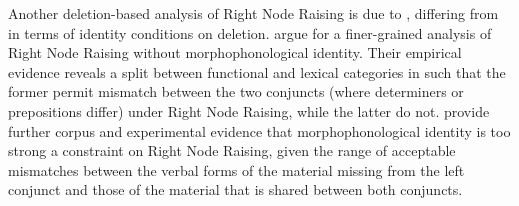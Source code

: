 


%

Another deletion-based analysis of Right Node Raising is due to \citet{Abeille2016, Shiraishi2019},
differing from \citet{Chaves2014} in terms of identity conditions on deletion. \citet{Abeille2016}
argue for a finer-grained analysis of  Right Node Raising without morphophonological
identity. Their empirical evidence reveals a split between functional and lexical categories in
 such that the former permit mismatch between the two conjuncts (where determiners or
prepositions differ) under Right Node Raising, while the latter do not. \citet{Shiraishi2019}
provide further corpus and experimental evidence that morphophonological identity is too strong a
constraint on Right Node Raising, given the range of acceptable mismatches between the verbal forms
of the material missing from the left conjunct and those of the material that is shared between both
conjuncts.  



